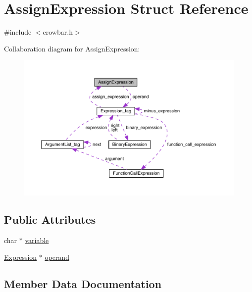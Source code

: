 \hypertarget{struct_assign_expression}{}\section{Assign\+Expression Struct Reference}
\label{struct_assign_expression}


{\ttfamily \#include $<$crowbar.\+h$>$}



Collaboration diagram for Assign\+Expression\+:\nopagebreak
\begin{figure}[H]
\begin{center}
\leavevmode
\includegraphics[width=350pt]{struct_assign_expression__coll__graph}
\end{center}
\end{figure}
\subsection*{Public Attributes}
\begin{DoxyCompactItemize}
\item 
char $\ast$ \hyperlink{struct_assign_expression_a0f54a893d9f786a38c10c166caa7dd08}{variable}
\item 
\hyperlink{crowbar_8h_a070c6feb370aad8a9665ca315bf6ed4a}{Expression} $\ast$ \hyperlink{struct_assign_expression_ae2bc8d22ef9baa0b02a484c3284559a6}{operand}
\end{DoxyCompactItemize}


\subsection{Member Data Documentation}
\hypertarget{struct_assign_expression_ae2bc8d22ef9baa0b02a484c3284559a6}{}
